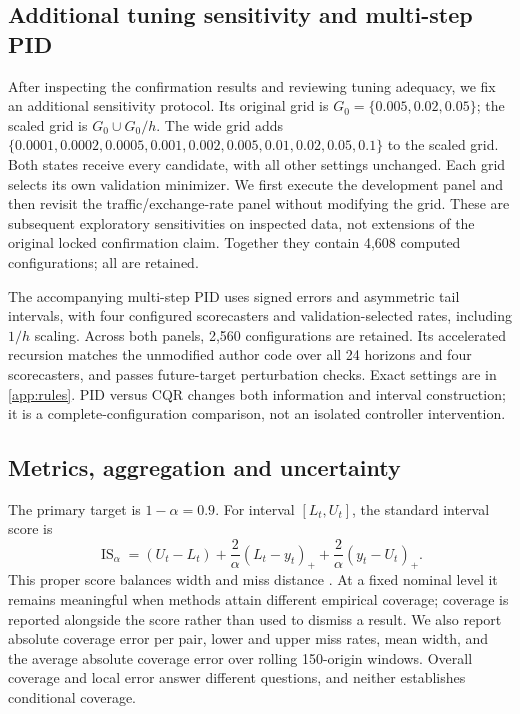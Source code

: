 \documentclass[preprint,11pt]{elsarticle}
\newcommand{\IS}{\operatorname{IS}}
\begin{document}
\subsection{Additional tuning sensitivity and multi-step PID}\label{sec:v8design}
After inspecting the confirmation results and reviewing tuning adequacy, we fix an
additional sensitivity protocol. Its original grid is $G_0=\{0.005,0.02,0.05\}$;
the scaled grid is $G_0\cup G_0/h$. The wide grid adds
$\{0.0001,0.0002,0.0005,0.001,0.002,0.005,0.01,0.02,0.05,0.1\}$ to the scaled grid.
Both states receive every candidate, with all other settings unchanged. Each grid
selects its own validation minimizer. We first execute the development panel and then
revisit the traffic/exchange-rate panel without modifying the grid. These are subsequent
exploratory sensitivities on inspected data, not extensions of the original locked
confirmation claim. Together they contain 4,608 computed configurations; all are retained.

The accompanying multi-step PID uses signed errors and asymmetric tail intervals,
with four configured scorecasters and validation-selected rates, including $1/h$
scaling. Across both panels, 2,560 configurations are retained. Its accelerated
recursion matches the unmodified author code over all 24 horizons and four
scorecasters, and passes future-target perturbation checks. Exact settings are in
\ref{app:rules}. PID versus CQR changes both information and interval construction;
it is a complete-configuration comparison, not an isolated controller intervention.

\subsection{Metrics, aggregation and uncertainty}
The primary target is $1-\alpha=0.9$. For interval $[L_t,U_t]$, the standard interval
score is
\begin{equation}
 \IS_\alpha=(U_t-L_t)+\frac{2}{\alpha}(L_t-y_t)_+
                         +\frac{2}{\alpha}(y_t-U_t)_+.
\end{equation}
This proper score balances width and miss distance \citep{winkler1972,gneiting2007proper}.
At a fixed nominal level it remains meaningful when methods attain different empirical
coverage; coverage is reported alongside the score rather than used to dismiss a result.
We also report absolute coverage error per pair, lower and upper miss rates, mean width,
and the average absolute coverage error over rolling 150-origin windows. Overall coverage
and local error answer different questions, and neither establishes conditional coverage.
\end{document}
